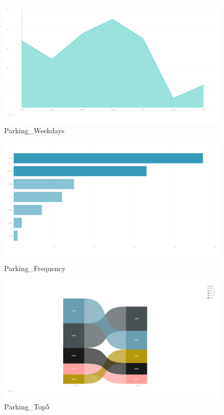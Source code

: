 \documentclass[11pt]{article}
\makeatletter
\def\maxwidth{\ifdim\Gin@nat@width>\linewidth\linewidth
    \else\Gin@nat@width\fi}
\let\Oldincludegraphics\includegraphics
\renewcommand{\includegraphics}[1]{\Oldincludegraphics[width=.8\maxwidth]{#1}}
\makeatother
\begin{document}
    \begin{figure}
\centering
\includegraphics{images/4_parking_weekdays_ranked.PNG}
\caption{Parking\_Weekdays}
\end{figure}

    \begin{figure}
\centering
\includegraphics{images/5_parking_weekdays_frequency_ranked.PNG}
\caption{Parking\_Frequency}
\end{figure}

    \begin{figure}
\centering
\includegraphics{images/6_parking_top5.PNG}
\caption{Parking\_Top5}
\end{figure}
\end{document}
